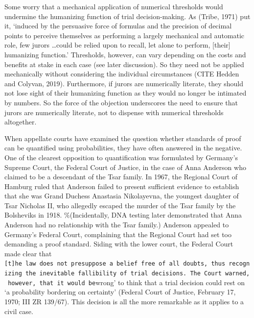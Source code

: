 \documentclass[10pt,dvipsnames]{scrartcl}
\begin{document}
Some worry that a mechanical application of numerical thresholds would
undermine the humanizing function of trial decision-making. As (Tribe,
1971) put it, `induced by the persuasive force of formulas and the
precision of decimal points to perceive themselves as performing a
largely mechanical and automatic role, few jurors \dots could be relied
upon to recall, let alone to perform, {[}their{]} humanizing function.'
Thresholds, however, can vary depending on the costs and benefits at
stake in each case (see later discussion). So they need not be applied
mechanically without considering the individual circumstances (CITE
Hedden and Colyvan, 2019). Furthermore, if jurors are numerically
literate, they should not lose sight of their humanizing function as
they would no longer be intimated by numbers. So the force of the
objection underscores the need to ensure that jurors are numerically
literate, not to dispense with numerical thresholds altogether.

When appellate courts have examined the question whether standards of
proof can be quantified using probabilities, they have often answered in
the negative. One of the clearest opposition to quantification was
formulated by Germany's Supreme Court, the Federal Court of Justice, in
the case of Anna Anderson who claimed to be a descendant of the Tsar
family. In 1967, the Regional Court of Hamburg ruled that Anderson
failed to present sufficient evidence to establish that she was Grand
Duchess Anastasia Nikolayevna, the youngest daughter of Tsar Nicholas
II, who allegedly escaped the murder of the Tsar family by the
Bolsheviks in 1918. \%(Incidentally, DNA testing later demonstrated that
Anna Anderson had no relationship with the Tsar family.) Anderson
appealed to Germany's Federal Court, complaining that the Regional Court
had set too demanding a proof standard. Siding with the lower court, the
Federal Court made clear that
\texttt{{[}t{]}he\ law\ does\ not\ presuppose\ a\ belief\ free\ of\ all\ doubts\textquotesingle{},\ thus\ recognizing\ the\ inevitable\ fallibility\ of\ trial\ decisions.\ The\ Court\ warned,\ however,\ that\ it\ would\ be}wrong'
to think that a trial decision could rest on `a probability bordering on
certainty' (Federal Court of Justice, February 17, 1970; III ZR 139/67).
This decision is all the more remarkable as it applies to a civil case.
\end{document}
